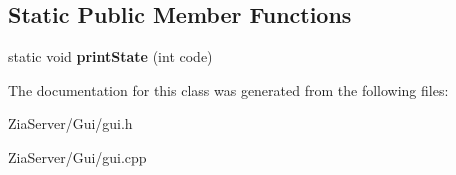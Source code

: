 \subsection*{Static Public Member Functions}
\begin{DoxyCompactItemize}
\item 
\hypertarget{classgui_a7d216373d047ee4e0546ce0c63d4b2bf}{
static void {\bfseries printState} (int code)}
\label{classgui_a7d216373d047ee4e0546ce0c63d4b2bf}

\end{DoxyCompactItemize}


The documentation for this class was generated from the following files:\begin{DoxyCompactItemize}
\item 
ZiaServer/Gui/gui.h\item 
ZiaServer/Gui/gui.cpp\end{DoxyCompactItemize}
